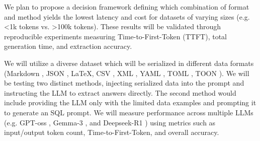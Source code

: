 \documentclass[a4paper, 12pt]{article}
\begin{document}
\ContributionsParagraph
We plan to propose a decision framework defining which combination of format and method yields the lowest
latency and cost for datasets of varying sizes (e.g. <1k tokens vs. >100k tokens). These results will be
validated through reproducible experiments measuring Time-to-First-Token (TTFT), total generation time, and
extraction accuracy.

\MethodologyParagraph
We will utilize a diverse dataset which will be serialized in different data formats (Markdown , JSON ,
\LaTeX , CSV , XML , YAML , TOML , TOON \cite{toon2025spec} ). We will be testing two distinct methods,
injecting serialized data into the prompt and instructing the LLM to extract answers directly. The second
method would include providing the LLM only with the limited data examples and prompting it to generate an
SQL prompt. We will measure performance across multiple LLMs (e.g. GPT-oss \cite{agarwal2025gpt}, Gemma-3
\cite{team2025gemma}, and Deepseek-R1 \cite{guo2025deepseek}) using metrics such as input/output token count,
Time-to-First-Token, and overall accuracy.


\end{document}
